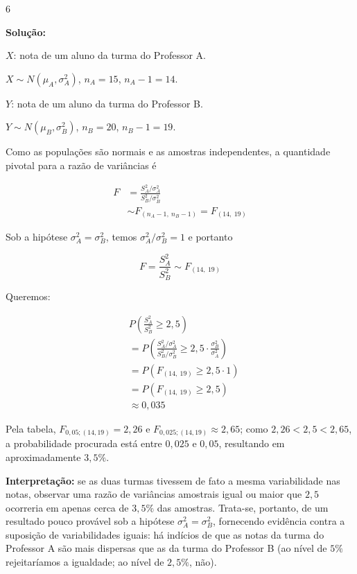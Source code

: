 \documentclass[8pt, a4paper, landscape]{extarticle}
\begin{document}
\begin{multicols}{6}
\vspace{0.3cm}

\textbf{Solução:}

$X$: nota de um aluno da turma do Professor A.

$X \sim N(\mu_A, \sigma_A^2)$, \quad $n_A = 15$, \quad $n_A - 1 = 14$.

$Y$: nota de um aluno da turma do Professor B.

$Y \sim N(\mu_B, \sigma_B^2)$, \quad $n_B = 20$, \quad $n_B - 1 = 19$.

Como as populações são normais e as amostras independentes, a quantidade pivotal para a razão de variâncias é

\begin{equation*}
\begin{split}
F &= \frac{S_A^2/\sigma_A^2}{S_B^2/\sigma_B^2} \\
  &\sim F_{(n_A - 1,\ n_B - 1)} = F_{(14,\ 19)}
\end{split}
\end{equation*}

Sob a hipótese $\sigma_A^2 = \sigma_B^2$, temos $\sigma_A^2/\sigma_B^2 = 1$ e portanto

\begin{equation*}
F = \frac{S_A^2}{S_B^2} \sim F_{(14,\ 19)}
\end{equation*}

Queremos:

\begin{equation*}
\begin{split}
&P\left(\frac{S_A^2}{S_B^2} \geq 2,5\right) \\
&= P\left(\frac{S_A^2/\sigma_A^2}{S_B^2/\sigma_B^2} \geq 2,5 \cdot \frac{\sigma_B^2}{\sigma_A^2}\right) \\
&= P\left(F_{(14,\ 19)} \geq 2,5 \cdot 1\right) \\
&= P\left(F_{(14,\ 19)} \geq 2,5\right) \\
&\approx 0,035
\end{split}
\end{equation*}

{\raggedright Pela tabela, $F_{0,05;(14,19)} = 2,26$ e $F_{0,025;(14,19)} \approx 2,65$; como $2,26 < 2,5 < 2,65$, a probabilidade procurada está entre $0,025$ e $0,05$, resultando em aproximadamente $3,5\%$.\par}

\textbf{Interpretação:} se as duas turmas tivessem de fato a mesma variabilidade nas notas, observar uma razão de variâncias amostrais igual ou maior que $2,5$ ocorreria em apenas cerca de $3,5\%$ das amostras. Trata-se, portanto, de um resultado pouco provável sob a hipótese $\sigma_A^2 = \sigma_B^2$, fornecendo evidência contra a suposição de variabilidades iguais: há indícios de que as notas da turma do Professor A são mais dispersas que as da turma do Professor B (ao nível de $5\%$ rejeitaríamos a igualdade; ao nível de $2,5\%$, não).


\end{multicols}
\end{document}
